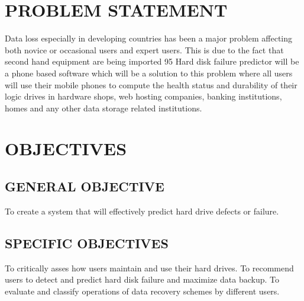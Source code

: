 \documentclass{article}
\begin{document}
\section{PROBLEM STATEMENT}
Data loss especially in developing countries has been a major problem affecting both novice or occasional users and expert users. This is due to the fact that second hand equipment are being imported 95%
Hard disk failure predictor will be a phone based software which will be  a solution to this problem where  all users will use their mobile phones to compute the health status and  durability of  their  logic drives in hardware shops, web hosting companies, banking institutions, homes and any other data storage related institutions. 
\section{OBJECTIVES}
\subsection{GENERAL OBJECTIVE}
To create a system that will effectively predict hard drive defects or failure.
\subsection{SPECIFIC OBJECTIVES}
To critically asses how users maintain and use their hard drives.
To recommend users to detect and predict hard disk failure and maximize data backup.
To evaluate and classify operations of data recovery schemes by different users.
\end{document}
